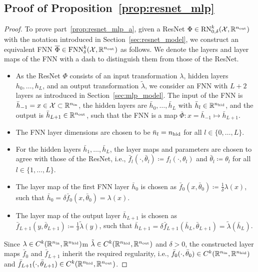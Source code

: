 \documentclass[10pt]{article}
\theoremstyle{definition}
\numberwithin{equation}{section}
\newcommand{\R}{\mathbb{R}}
\newcommand*{\nout}{n_\textup{out}}
\newcommand*{\nhid}{n_\textup{hid}}
\newcommand*{\nin}{n_\textup{in}}
\newcommand*{\FNN}{\textup{FNN}_{\delta}^k(\mathcal{X},\R^{\nout})}
\begin{document}
    \subsection{Proof of Proposition~\ref{prop:resnet_mlp}}
    \label{app:proof_resnet_mlp}

\begin{proof}
    To prove part~\ref{prop:resnet_mlp_a}, given a ResNet $\Phi \in \textup{RN}_{0,\delta}^k(\mathcal{X},\R^{\nout})$ with the notation introduced in Section~\ref{sec:resnet_model}, we construct an equivalent FNN $\overline{\Phi} \in \FNN$ as follows. We denote the layers and layer maps of the FNN with a dash to distinguish them from those of the ResNet.
    \begin{itemize}
        \item As the ResNet $\Phi$ consists of an input transformation $\lambda$, hidden layers $h_0,\ldots,h_L$, and an output transformation $\tilde{\lambda}$, we consider an FNN with $L+2$ layers as introduced in Section~\ref{sec:mlp_model}. The input of the FNN is $\bar{h}_{-1} = x \in \mathcal{X}\subset \R^{\nin}$, the hidden layers are $\bar{h}_0, \ldots, \bar{h}_L$ with $\bar{h}_l \in \R^{\nhid}$, and the output is $\bar{h}_{L+1}\in\R^{\nout}$, such that the FNN is a map $\overline{\Phi}: x = \bar{h}_{-1}\mapsto \bar{h}_{L+1}$.
        \item The FNN layer dimensions are chosen to be $\bar{n}_l = \nhid$ for all $l \in \{0,\ldots,L\}$.
        \item For the hidden layers $\bar{h}_1, \ldots, \bar{h}_L$, the layer maps and parameters are chosen to agree with those of the ResNet, i.e., $\bar{f}_l(\cdot,\bar{\theta}_l) \coloneqq f_l(\cdot,\theta_l)$ and $\bar{\theta}_l \coloneqq \theta_l$ for all $l \in \{1,\ldots,L\}$.
        \item The layer map of the first FNN layer $\bar{h}_0$ is chosen as $\bar{f}_0(x,\bar{\theta}_0) \coloneqq \frac{1}{\delta}\lambda(x)$, such that $\bar{h}_0 = \delta \bar{f}_0(x,\bar{\theta}_0) = \lambda(x)$.
        \item The layer map of the output layer $\bar{h}_{L+1}$ is chosen as $\bar{f}_{L+1}(y,\bar{\theta}_{L+1}) \coloneqq \frac{1}{\delta}\tilde{\lambda}(y)$, such that $\bar{h}_{L+1} = \delta \bar{f}_{L+1}(\bar{h}_L,\bar{\theta}_{L+1}) = \tilde{\lambda}(\bar{h}_L)$.
    \end{itemize}
    Since $\lambda \in C^k(\R^{\nin},\R^{\nhid})$m $\tilde{\lambda} \in C^k(\R^{\nhid},\R^{\nout})$ and $\delta > 0$, the constructed layer maps $\bar{f}_0$ and $\bar{f}_{L+1}$ inherit the required regularity, i.e., $\bar{f}_0(\cdot,\bar{\theta}_0) \in C^k(\R^{\nin},\R^{\nhid})$ and $\bar{f}_{L+1}(\cdot,\bar{\theta}_{L+1}) \in C^k(\R^{\nhid},\R^{\nout})$.
    

\end{proof}
\end{document}
